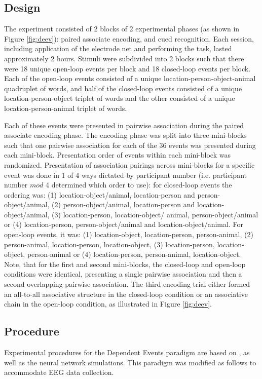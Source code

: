 \documentclass[11pt, titlepage, twoside]{article}
\begin{document}
\subsection{Design}
The experiment consisted of 2 blocks of 2 experimental phases (as shown in Figure \ref{fig:deev}): paired associate encoding, and cued recognition. Each session, including application of the electrode net and performing the task, lasted approximately 2 hours. Stimuli were subdivided into 2 blocks such that there were 18 unique open-loop events per block and 18 closed-loop events per block.  Each of the open-loop events consisted of a unique location-person-object-animal quadruplet of words, and half of the closed-loop events consisted of a unique location-person-object triplet of words and the other consisted of a unique location-person-animal triplet of words.  

Each of these events were presented in pairwise association during the paired associate encoding phase.  The encoding phase was split into three mini-blocks such that one pairwise association for each of the 36 events was presented during each mini-block. Presentation order of events within each mini-block was randomized. Presentation of association pairings across mini-blocks for a specific event was done in 1 of 4 ways dictated by participant number (i.e. participant number $mod$ 4 determined which order to use): for closed-loop events the ordering was: (1) location-object/animal, location-person and person-object/animal, (2) person-object/animal, location-person and location-object/animal, (3) location-person, location-object/ animal, person-object/animal or (4) location-person, person-object/animal and location-object/animal. For open-loop events, it was: (1) location-object, location-person, person-animal, (2) person-animal, location-person, location-object, (3) location-person, location-object, person-animal or (4) location-person, person-animal, location-object.  Note, that  for the first and second mini-blocks, the closed-loop and open-loop conditions were identical, presenting a single pairwise association and then a second overlapping pairwise association. The third encoding trial either formed an all-to-all associative structure in the closed-loop condition or an associative chain in the open-loop condition, as illustrated in Figure \ref{fig:deev}.


\subsection{Procedure}
Experimental procedures for the Dependent Events paradigm are based on \textcite{HornerBisbyBushEtAl15}, as well as the neural network simulations.  This paradigm was modified as follows to accommodate EEG data collection.  
\end{document}
